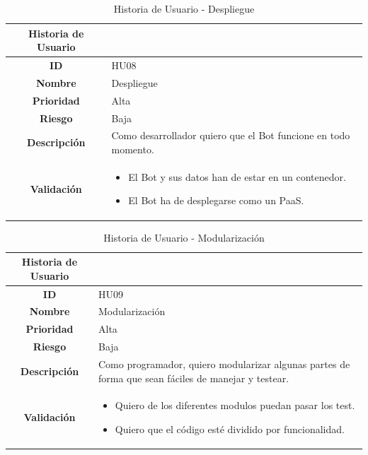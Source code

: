 \begin{table}[H]
	\begin{center}
		\begin{tabular}{| c | p{9cm} |}
			\hline
			
			Historia de Usuario &  \\ \hline
			
			
			\textbf{ID} & HU08 \\
			\textbf{Nombre} & Despliegue \\
			\textbf{Prioridad} & Alta \\
			\textbf{Riesgo} & Baja \\
			\textbf{Descripción} & Como desarrollador quiero que el Bot funcione en todo momento. \\
			\textbf{Validación} & \begin{itemize}
				\item El Bot y sus datos han de estar en un contenedor.
				\item El Bot ha de desplegarse como un PaaS.
			\end{itemize} \\ \hline
		\end{tabular}
		\caption{Historia de Usuario - Despliegue}
	\end{center}
\end{table}

\begin{table}[H]
	\begin{center}
		\begin{tabular}{| c | p{9cm} |}
			\hline
			
			Historia de Usuario &  \\ \hline
			
			
			\textbf{ID} & HU09 \\
			\textbf{Nombre} & Modularización \\
			\textbf{Prioridad} & Alta \\
			\textbf{Riesgo} & Baja \\
			\textbf{Descripción} & Como programador, quiero modularizar algunas partes de forma que sean fáciles de manejar y testear. \\
			\textbf{Validación} & \begin{itemize}
				\item Quiero de los diferentes modulos puedan pasar los test.
				\item Quiero que el código esté dividido por funcionalidad.
			\end{itemize} \\ \hline
		\end{tabular}
		\caption{Historia de Usuario - Modularización}
	\end{center}
\end{table}

